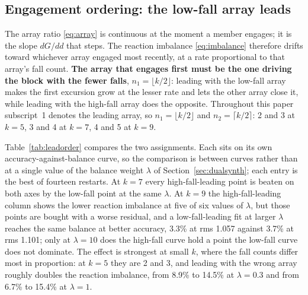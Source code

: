 \documentclass[preprint,12pt,number]{elsarticle}
\begin{document}
\subsection{Engagement ordering: the low-fall array leads}
\label{sec:order}

The array ratio \eqref{eq:array} is continuous at the moment a member engages; it is the slope $dG/dd$ that steps. The reaction imbalance \eqref{eq:imbalance} therefore drifts toward whichever array engaged most recently, at a rate proportional to that array's fall count. \textbf{The array that engages first must be the one driving the block with the fewer falls}, $n_1 = \lfloor k/2 \rfloor$: leading with the low-fall array makes the first excursion grow at the lesser rate and lets the other array close it, while leading with the high-fall array does the opposite. Throughout this paper subscript~1 denotes the leading array, so $n_1 = \lfloor k/2 \rfloor$ and $n_2 = \lceil k/2 \rceil$: 2 and 3 at $k=5$, 3 and 4 at $k=7$, 4 and 5 at $k=9$.

Table~\ref{tab:leadorder} compares the two assignments. Each sits on its own accuracy-against-balance curve, so the comparison is between curves rather than at a single value of the balance weight $\lambda$ of Section~\ref{sec:dualsynth}; each entry is the best of fourteen restarts. At $k=7$ every high-fall-leading point is beaten on both axes by the low-fall point at the same $\lambda$. At $k=9$ the high-fall-leading column shows the lower reaction imbalance at five of six values of $\lambda$, but those points are bought with a worse residual, and a low-fall-leading fit at larger $\lambda$ reaches the same balance at better accuracy, 3.3\% at rms 1.057 against 3.7\% at rms 1.101; only at $\lambda = 10$ does the high-fall curve hold a point the low-fall curve does not dominate. The effect is strongest at small $k$, where the fall counts differ most in proportion: at $k=5$ they are 2 and 3, and leading with the wrong array roughly doubles the reaction imbalance, from 8.9\% to 14.5\% at $\lambda = 0.3$ and from 6.7\% to 15.4\% at $\lambda = 1$.
\end{document}
